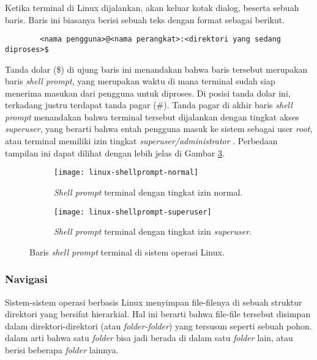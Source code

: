 Ketika terminal di Linux dijalankan, akan keluar kotak dialog, beserta sebuah baris. Baris ini biasanya berisi sebuah teks dengan format sebagai berikut.

\begin{verbatim}
        <nama pengguna>@<nama perangkat>:<direktori yang sedang diproses>$
\end{verbatim}

Tanda dolar (\$) di ujung baris ini menandakan bahwa baris tersebut merupakan baris \textit{shell prompt}, yang merupakan waktu di mana terminal sudah siap menerima masukan dari pengguna untuk diproses. Di posisi tanda dolar ini, terkadang justru terdapat tanda pagar (\#). Tanda pagar di akhir baris \textit{shell prompt} menandakan bahwa terminal tersebut dijalankan dengan tingkat akses \textit{superuser}, yang berarti bahwa entah pengguna masuk ke sistem sebagai user \textit{root}, atau terminal memiliki izin tingkat \textit{superuser/administrator} \cite{shottsjr:2019:linuxcommandline}. Perbedaan tampilan ini dapat dilihat dengan lebih jelas di Gambar \ref{fig:commandline-shellprompt-linux}.

\begin{figure}[ht]
    \begin{subfigure}[b]{0.475\linewidth}
		\centering
		\texttt{[image: linux-shellprompt-normal]}
		\caption{\textit{Shell prompt} terminal dengan tingkat izin \mbox{normal}.}
		\label{fig:shellprompt-linux-normal}
	\end{subfigure}
	\hfill
    \begin{subfigure}[b]{0.475\linewidth}
		\centering
		\texttt{[image: linux-shellprompt-superuser]}
		\caption{\textit{Shell prompt} terminal dengan tingkat izin \textit{\mbox{superuser}}.}
		\label{fig:shellprompt-linux-superuser}
	\end{subfigure}
    \caption{Baris \textit{shell prompt} terminal di sistem operasi Linux.}
	\label{fig:commandline-shellprompt-linux}
\end{figure}

\subsubsection{Navigasi \cite{shottsjr:2019:linuxcommandline}}
\label{sec:commandline-linux-nav}

Sistem-sistem operasi berbasis Linux menyimpan file-filenya di sebuah struktur direktori yang bersifat hierarkial. Hal ini berarti bahwa file-file tersebut disimpan dalam direktori-direktori (atau \textit{folder-folder}) yang tersusun seperti sebuah pohon. dalam arti bahwa satu \textit{folder} bisa jadi berada di dalam satu \textit{folder} lain, atau berisi beberapa \textit{folder} lainnya.

